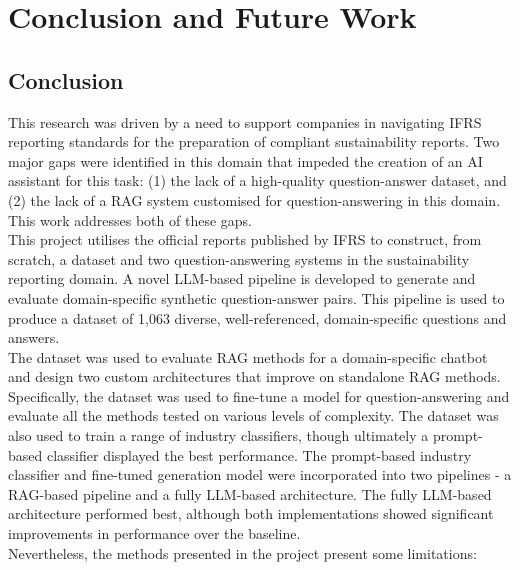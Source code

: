 

\chapter{Conclusion and Future Work}

\section{Conclusion}

This research was driven by a need to support companies in navigating IFRS reporting standards for the preparation of compliant sustainability reports. Two major gaps were identified in this domain that impeded the creation of an AI assistant for this task: (1) the lack of a high-quality question-answer dataset, and (2) the lack of a RAG system customised for question-answering in this domain. This work addresses both of these gaps. \\

This project utilises the official reports published by IFRS to construct, from scratch, a dataset and two question-answering systems in the sustainability reporting domain. A novel LLM-based pipeline is developed to generate and evaluate domain-specific synthetic question-answer pairs. This pipeline is used to produce a dataset of 1,063 diverse, well-referenced, domain-specific questions and answers. \\

The dataset was used to evaluate RAG methods for a domain-specific chatbot and design two custom architectures that improve on standalone RAG methods. Specifically, the dataset was used to fine-tune a model for question-answering and evaluate all the methods tested on various levels of complexity. The dataset was also used to train a range of industry classifiers, though ultimately a prompt-based classifier displayed the best performance. The prompt-based industry classifier and fine-tuned generation model were incorporated into two pipelines - a RAG-based pipeline and a fully LLM-based architecture. The fully LLM-based architecture performed best, although both implementations showed significant improvements in performance over the baseline. \\

Nevertheless, the methods presented in the project present some limitations:

